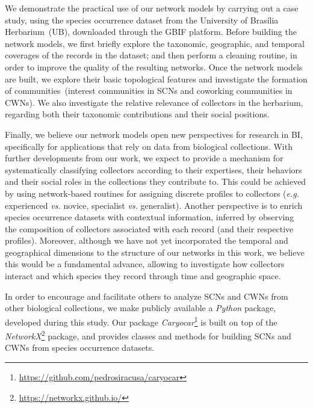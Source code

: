 We demonstrate the practical use of our network models by carrying out a case study, using the species occurrence dataset from the University of Brasília Herbarium~(UB), downloaded through the GBIF platform.
Before building the network models, we first briefly explore the taxonomic, geographic, and temporal coverages of the records in the dataset; and then perform a cleaning routine, in order to improve the quality of the resulting networks.
Once the network models are built, we explore their basic topological features and investigate the formation of communities~(interest communities in SCNs and coworking communities in CWNs).
We also investigate the relative relevance of collectors in the herbarium, regarding both their taxonomic contributions and their social positions.

Finally, we believe our network models open new perspectives for research in BI, specifically for applications that rely on data from biological collections. 
With further developments from our work, we expect to provide a mechanism for systematically classifying collectors according to their expertises, their behaviors and their social roles in the collections they contribute to.
This could be achieved by using network-based routines for assigning discrete profiles to collectors (\textit{e.g.} experienced \textit{vs.} novice, specialist \textit{vs.} generalist).
Another perspective is to enrich species occurrence datasets with contextual information, inferred by observing the composition of collectors associated with each record (and their respective profiles).
Moreover, although we have not yet incorporated the temporal and geographical dimensions to the structure of our networks in this work, we believe this would be a fundamental advance, allowing to investigate how collectors interact and which species they record through time and geographic space. 


In order to encourage and facilitate others to analyze SCNs and CWNs from other biological collections, we make  publicly available a \textit{Python} package, developed during this study.
Our package \textit{Caryocar}\footnote{\url{https://github.com/pedrosiracusa/caryocar}} is built on top of the \textit{NetworkX}\footnote{\url{https://networkx.github.io/}} package, and provides classes and methods for building SCNs and CWNs from species occurrence datasets.


